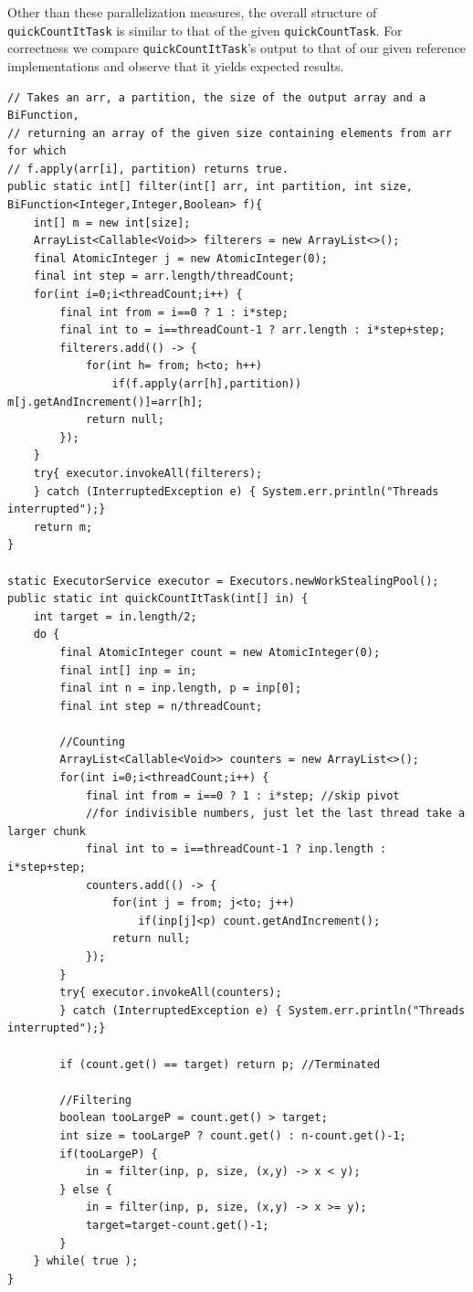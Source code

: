 \documentclass[a5paper]{article}
\begin{document}
Other than these parallelization measures, the overall structure of \texttt{quickCountItTask} is similar to that of the given \texttt{quickCountTask}.
For correctness we compare \texttt{quickCountItTask}'s output to that of our given reference implementations and observe that it yields expected results.

\begin{lstlisting}
// Takes an arr, a partition, the size of the output array and a BiFunction,
// returning an array of the given size containing elements from arr for which 
// f.apply(arr[i], partition) returns true.
public static int[] filter(int[] arr, int partition, int size,  BiFunction<Integer,Integer,Boolean> f){
    int[] m = new int[size];
    ArrayList<Callable<Void>> filterers = new ArrayList<>();
    final AtomicInteger j = new AtomicInteger(0);
    final int step = arr.length/threadCount;
    for(int i=0;i<threadCount;i++) {
        final int from = i==0 ? 1 : i*step;
        final int to = i==threadCount-1 ? arr.length : i*step+step;
        filterers.add(() -> {
            for(int h= from; h<to; h++)
                if(f.apply(arr[h],partition)) m[j.getAndIncrement()]=arr[h];
            return null;
        });
    }
    try{ executor.invokeAll(filterers);
    } catch (InterruptedException e) { System.err.println("Threads interrupted");}
    return m;
}

static ExecutorService executor = Executors.newWorkStealingPool();
public static int quickCountItTask(int[] in) {
    int target = in.length/2;
    do {
        final AtomicInteger count = new AtomicInteger(0);
        final int[] inp = in;
        final int n = inp.length, p = inp[0];
        final int step = n/threadCount;

        //Counting
        ArrayList<Callable<Void>> counters = new ArrayList<>();
        for(int i=0;i<threadCount;i++) {
            final int from = i==0 ? 1 : i*step; //skip pivot
            //for indivisible numbers, just let the last thread take a larger chunk
            final int to = i==threadCount-1 ? inp.length : i*step+step;
            counters.add(() -> {
                for(int j = from; j<to; j++)
                    if(inp[j]<p) count.getAndIncrement(); 
                return null;
            });
        }
        try{ executor.invokeAll(counters);
        } catch (InterruptedException e) { System.err.println("Threads interrupted");}

        if (count.get() == target) return p; //Terminated

        //Filtering
        boolean tooLargeP = count.get() > target;
        int size = tooLargeP ? count.get() : n-count.get()-1;
        if(tooLargeP) {
            in = filter(inp, p, size, (x,y) -> x < y);
        } else {
            in = filter(inp, p, size, (x,y) -> x >= y);
            target=target-count.get()-1;
        }
    } while( true );
}
\end{lstlisting}
\end{document}
